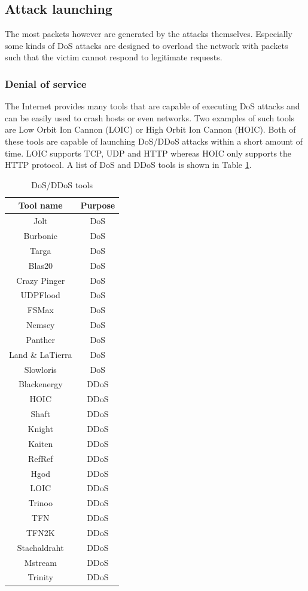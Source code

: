 \documentclass[conference]{IEEEtran}
\begin{document}
\subsection{Attack launching}
The most packets however are generated by the attacks themselves.
Especially some kinds of DoS attacks are designed to overload the network with packets such that the victim cannot respond to legitimate requests. 

\subsubsection{Denial of service}
The Internet provides many tools that are capable of executing DoS attacks and can be easily used to crash hosts or even networks.
Two examples of such tools are Low Orbit Ion Cannon (LOIC) or High Orbit Ion Cannon (HOIC). Both of these tools are capable of launching DoS/DDoS attacks within a short amount of time.
LOIC supports TCP, UDP and HTTP whereas HOIC only supports the HTTP protocol\cite{b1}. A list of DoS and DDoS tools is shown in Table \ref{table:ddos-tools}.

\begin{table}[htbp]
\caption{DoS/DDoS tools \cite{b1}} 
\centering
\begin{tabular}{ | c | c | }
\hline
Tool name & Purpose \\
\hline
Jolt & DoS \\
Burbonic & DoS \\
Targa & DoS \\
Blas20 & DoS \\
Crazy Pinger & DoS \\
UDPFlood & DoS \\
FSMax & DoS \\
Nemsey & DoS \\
Panther & DoS \\
Land \& LaTierra & DoS \\
Slowloris & DoS \\
Blackenergy & DDoS \\
HOIC & DDoS \\
Shaft & DDoS \\
Knight & DDoS \\
Kaiten & DDoS \\
RefRef & DDoS \\
Hgod & DDoS \\
LOIC & DDoS \\
Trinoo & DDoS \\
TFN & DDoS \\
TFN2K & DDoS \\
Stachaldraht & DDoS \\
Mstream & DDoS \\
Trinity & DDoS \\
\hline
\end{tabular}
\label{table:ddos-tools}
\end{table}
\end{document}
